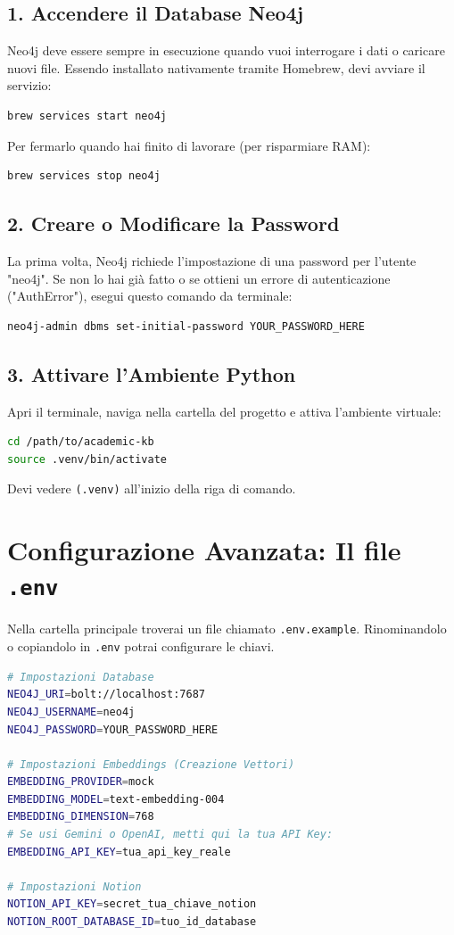\documentclass[12pt,a4paper]{article}
\begin{document}
\subsection{1. Accendere il Database Neo4j}
Neo4j deve essere sempre in esecuzione quando vuoi interrogare i dati o caricare nuovi file. Essendo installato nativamente tramite Homebrew, devi avviare il servizio:
\begin{lstlisting}[language=bash]
brew services start neo4j
\end{lstlisting}
Per fermarlo quando hai finito di lavorare (per risparmiare RAM):
\begin{lstlisting}[language=bash]
brew services stop neo4j
\end{lstlisting}

\subsection{2. Creare o Modificare la Password}
La prima volta, Neo4j richiede l'impostazione di una password per l'utente "neo4j". Se non lo hai già fatto o se ottieni un errore di autenticazione ("AuthError"), esegui questo comando da terminale:
\begin{lstlisting}[language=bash]
neo4j-admin dbms set-initial-password YOUR_PASSWORD_HERE
\end{lstlisting}

\subsection{3. Attivare l'Ambiente Python}
Apri il terminale, naviga nella cartella del progetto e attiva l'ambiente virtuale:
\begin{lstlisting}[language=bash]
cd /path/to/academic-kb
source .venv/bin/activate
\end{lstlisting}
Devi vedere \texttt{(.venv)} all'inizio della riga di comando.

\section{Configurazione Avanzata: Il file \texttt{.env}}
Nella cartella principale troverai un file chiamato \texttt{.env.example}. Rinominandolo o copiandolo in \texttt{.env} potrai configurare le chiavi.

\begin{lstlisting}[language=bash]
# Impostazioni Database
NEO4J_URI=bolt://localhost:7687
NEO4J_USERNAME=neo4j
NEO4J_PASSWORD=YOUR_PASSWORD_HERE

# Impostazioni Embeddings (Creazione Vettori)
EMBEDDING_PROVIDER=mock
EMBEDDING_MODEL=text-embedding-004
EMBEDDING_DIMENSION=768
# Se usi Gemini o OpenAI, metti qui la tua API Key:
EMBEDDING_API_KEY=tua_api_key_reale

# Impostazioni Notion
NOTION_API_KEY=secret_tua_chiave_notion
NOTION_ROOT_DATABASE_ID=tuo_id_database
\end{lstlisting}
\end{document}
